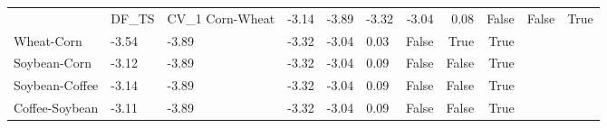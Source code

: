 \begin{tabular}{llllllrrr}
\toprule
 & DF_TS & CV_1%
\midrule
Corn-Wheat & -3.14 & -3.89 & -3.32 & -3.04 & 0.08 & False & False & True \\
Wheat-Corn & -3.54 & -3.89 & -3.32 & -3.04 & 0.03 & False & True & True \\
Soybean-Corn & -3.12 & -3.89 & -3.32 & -3.04 & 0.09 & False & False & True \\
Soybean-Coffee & -3.14 & -3.89 & -3.32 & -3.04 & 0.09 & False & False & True \\
Coffee-Soybean & -3.11 & -3.89 & -3.32 & -3.04 & 0.09 & False & False & True \\
\bottomrule
\end{tabular}
